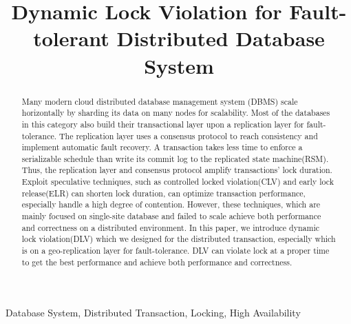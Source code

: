\documentclass[conference]{IEEEtran}
\begin{document}
\title{Dynamic Lock Violation for Fault-tolerant Distributed Database System}


\author{
\and
{}
}

\maketitle

\begin{abstract}
Many modern cloud distributed database management system (DBMS) scale horizontally by sharding its data on many nodes for scalability.
Most of the databases in this category also build their transactional layer upon a replication layer for fault-tolerance.
The replication layer uses a consensus protocol to reach consistency and implement automatic fault recovery.
A transaction takes less time to enforce a serializable schedule than write its commit log to the replicated state machine(RSM). 
Thus,  the replication layer and consensus protocol amplify transactions' lock duration.
Exploit speculative techniques, such as controlled locked violation(CLV) and early lock release(ELR) can shorten lock duration, can optimize transaction performance, especially handle a high degree of contention.
However, these techniques, which are mainly focused on single-site database and failed to scale achieve both performance and correctness on a distributed environment.
In this paper, we introduce dynamic lock violation(DLV) which we designed for the distributed transaction, especially which is on a geo-replication layer for fault-tolerance.
DLV can violate lock at a proper time to get the best performance and achieve both performance and correctness.

\end{abstract}

\begin{IEEEkeywords}
Database System, Distributed Transaction, Locking, High Availability
\end{IEEEkeywords}
\end{document}
